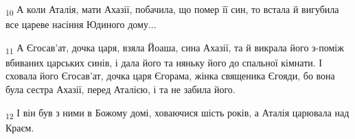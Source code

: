 \begin{tcolorbox}
\textsubscript{10} А коли Аталія, мати Ахазії, побачила, що помер її син, то встала й вигубила все цареве насіння Юдиного дому...
\end{tcolorbox}
\begin{tcolorbox}
\textsubscript{11} А Єгосав'ат, дочка царя, взяла Йоаша, сина Ахазії, та й викрала його з-поміж вбиваних царських синів, і дала його та няньку його до спальної кімнати. І сховала його Єгосав'ат, дочка царя Єгорама, жінка священика Єгояди, бо вона була сестра Ахазії, перед Аталією, і та не забила його.
\end{tcolorbox}
\begin{tcolorbox}
\textsubscript{12} І він був з ними в Божому домі, ховаючися шість років, а Аталія царювала над Краєм.
\end{tcolorbox}
